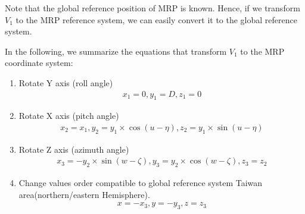 Note that the global reference position of MRP is known. Hence, if we transform \emph{$V_1$} to the MRP reference system, we can easily convert it to the global reference system.

In the following, we summarize the equations that transform \emph{$V_1$} to the MRP coordinate system:
\begin{enumerate}
  \item Rotate Y axis (roll angle)
\[\begin{array}{l}
x_1 = 0 , y_1 = D , z_1 = 0
\end{array}\]
  \item Rotate X axis (pitch angle)
\[\begin{array}{l}
x_2 = x_1 , y_2 = y_1 \times \cos (u-\eta) , z_2 = y_1 \times \sin (u-\eta)
\end{array}\]
  \item Rotate Z axis (azimuth angle)
\[\begin{array}{l}
x_3 =  - y_2 \times \sin (w-\zeta) , y_3 = y_2 \times \cos (w-\zeta) , z_3 = z_2
\end{array}\]
  \item Change values order compatible to global reference system Taiwan area(northern/eastern Hemisphere).
\[\begin{array}{l}
x =  - x_3 , y =  - y_3 , z = z_3
\end{array}\]
\end{enumerate}
